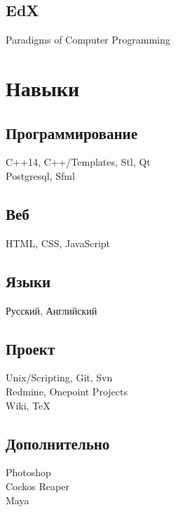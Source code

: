 \documentclass[a4paper]{curricula-vitae}
\begin{document}
\begin{minipage}[t]{0.33\textwidth}
\subsection{EdX}
Paradigms of Computer Programming

\insertspace

\section{Навыки}

\subsection{Программирование}
C++14, C++/Templates, Stl, Qt \\
Postgresql, Sfml

\insertspace

\subsection{Веб}
HTML, CSS, JavaScript

\insertspace

\subsection{Языки}
Русский, Английский

\insertspace

\subsection{Проект}
Unix/Scripting, Git, Svn \\
Redmine, Onepoint Projects \\
Wiki, TeX

\insertspace

\subsection{Дополнительно}
Photoshop \\ 
Cockos Reaper \\
Maya

\insertspace

\end{minipage} %
\hfill
\end{document}
